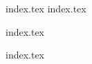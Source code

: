{index.tex}
%
\vspace{0.25in}%
%
{index.tex}
\maketitle
%
\vspace{0.25in}%
%
\begin{minipage}[t]{0.495\linewidth}
    {index.tex}
\end{minipage}%
%
\hfill%
%
\begin{minipage}[t]{0.495\linewidth}
    {index.tex}
\end{minipage}%
%
